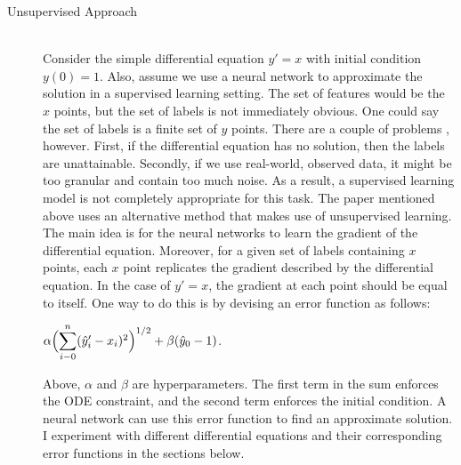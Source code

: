 \documentclass[12pt]{article}
\newcommand{\dsum}[2]{\mathlarger{\sum}_{#1}^{#2}}
\newcommand{\bgc}{\begin{center}}
\newcommand{\enc}{\end{center}}
\begin{document}
\begin{description}
    \item[Unsupervised Approach] \hfill \\
    Consider the simple differential equation $y' = x$ with initial condition
    $y(0) = 1$. Also, assume we use a neural network to approximate the
    solution in a supervised learning setting. The set of features would be the
    $x$ points, but the set of labels is not immediately obvious. One could say
    the set of labels is a finite set of $y$ points. There are a couple of
    problems , however. First, if the differential equation has no solution,
    then the labels are unattainable. Secondly, if we use real-world, observed
    data, it might be too granular and contain too much noise. As a result, a
    supervised learning model is not completely appropriate for this task. The
    paper mentioned above uses an alternative method that makes use of
    unsupervised learning. The main idea is for the neural networks to learn
    the gradient of the differential equation. Moreover, for a given set of
    labels containing $x$ points, each $x$ point replicates the gradient
    described by the differential equation. In the case of $y' = x$, the
    gradient at each point should be equal to itself. One way to do this is by
    devising an error function as follows: 
    \bgc 
    $\alpha\Bigl(\dsum{i-0}{n}(\hat{y}_i' - x_i)^2\Bigr)^{1/2} + \beta(\hat{y}_0 - 1)$.
    \enc
    Above, $\alpha$ and $\beta$ are hyperparameters. The first term in the sum
    enforces the ODE constraint, and the second term enforces the initial
    condition. A neural network can use this error function to find an
    approximate solution. I experiment with different differential equations
    and their corresponding error functions in the sections below. 


\end{description}
\end{document}
